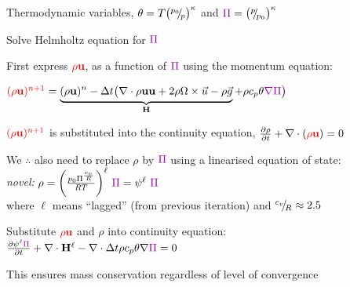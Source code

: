 \begin{slide}

\begin{list0}
\item 
    Thermodynamic variables, $\theta = T\bigl({^{p_0}\negthickspace/\negthinspace_{p}}\bigl)^\kappa$ and ${\color{purple}\Pi} = \bigl(\hfrac{p}{p_0}\bigl)^\kappa$\pauseHS

\item
    Solve Helmholtz equation for ${\color{purple}\Pi}$\pauseHS
\item
    First express $\color{red}\rho\mathbf{u}$, as a function of $\color{purple}\Pi$ using the momentum equation:

${\color{red} (\rho\mathbf{u})^{n+1}} = 
\underbrace{
    (\rho\mathbf{u})^n - \Delta t
    \bigl(
        \nabla\dprod\rho\mathbf{uu} + 2\rho\Omega\times\vec{u}
        - \rho\vec{g}
    }_{\mathbf{H}}
     + \rho c_p \theta{\color{purple} \nabla \Pi}
\bigr)$\pauseHS

\item
${\color{red} (\rho\mathbf{u})^{n+1}}$ is substituted into the continuity equation,
$\frac{\partial\rho}{\partial t} + \nabla\cdot({\color{red}\rho\mathbf{u}})=0$\pauseHS

\item
    We $\therefore$ also need to replace $\rho$ by $\color{purple}\Pi$ using a linearised equation of state:\\
{\color{blue}\em novel:}\vspace{1cm}
$\rho=
\biggl(
    \frac{p_{0}\Pi^\frac{c_v}{R}}{RT}
\biggr)^\ell
\ {\color{purple}\Pi}=\psi^\ell\ {\color{purple}\Pi}$\\
where $\ell$ means {}``lagged'' (from
previous iteration) and ${^{c_v}\negthickspace/\negthinspace_{R}}\approx 2.5$\pauseHS

\item
    Substitute $\color{red}\rho\mathbf{u}$ and $\rho$ into continuity equation:\\
$
\frac{\partial\psi^\ell{\color{purple}\Pi}}{\partial t}
+\nabla\cdot\mathbf{H}^\ell - \nabla\cdot\Delta t\rho c_p\theta\nabla{\color{purple}\Pi}=0
$\pauseHS

\item
This ensures mass conservation regardless of level of convergence
\end{list0}
\end{slide}


